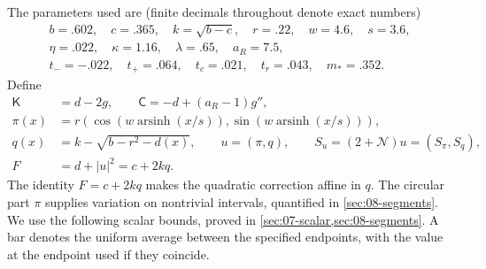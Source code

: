 The parameters used are (finite decimals throughout denote exact numbers)
\[
\begin{gathered}
 b=.602,\quad c=.365,\quad k=\sqrt{b-c},\quad r=.22,\quad w=4.6,\quad s=3.6,\\
 \eta=.022,\quad \kappa=1.16,\quad \lambda=.65,\quad a_R=7.5,\\
 t_-=-.022,\quad t_+=.064,\quad t_c=.021,\quad t_r=.043,\quad m_*=.352.
\end{gathered}
\]
Define
\[
\begin{aligned}
 \mathsf K&=d-2g,\qquad \mathsf C=-d+(a_R-1)g'',\\
 \pi(x)&=r(\cos(w\operatorname{arsinh}(x/s)),\sin(w\operatorname{arsinh}(x/s))),\\
 q(x)&=k-\sqrt{b-r^2-d(x)},\qquad u=(\pi,q),\qquad S_u=(2+\mathcal{N})u=(S_\pi,S_q),\\
 F&=d+|u|^2=c+2kq.
\end{aligned}
\]
The identity $F=c+2kq$ makes the quadratic correction affine in $q$. The circular part $\pi$ supplies variation on nontrivial intervals, quantified in \cref{sec:08-segments}. We use the following scalar bounds, proved in \cref{sec:07-scalar,sec:08-segments}. A bar denotes the uniform average between the specified endpoints, with the value at the endpoint used if they coincide.

